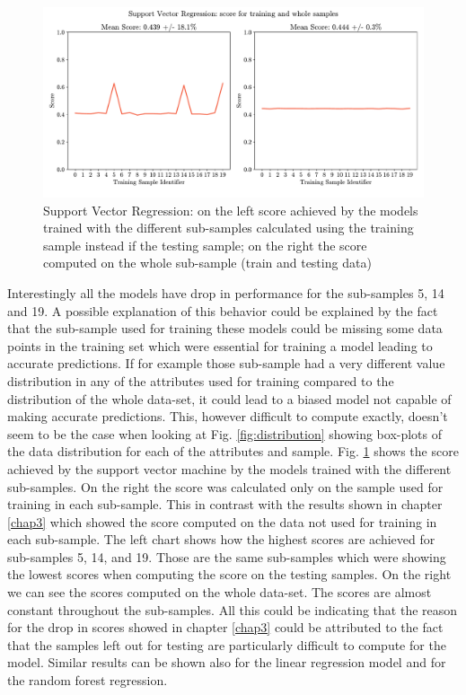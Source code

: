 \begin{figure}[!tp]
	\centering		  
	\includegraphics[width=1.\textwidth]{figures/SVR_score_tr.pdf}
	\caption{Support Vector Regression: on the left score achieved by the models trained with the different sub-samples calculated using the training sample instead if the testing sample; on the right the score computed on the whole sub-sample (train and testing data)}
	\label{fig:train-score}
\end{figure}

Interestingly all the models have drop in performance for the sub-samples  5, 14 and 19. A possible explanation of this behavior could be explained by the fact that the sub-sample used for training these models could be missing some data points in the training set which were essential for training a model leading to accurate predictions. If for example those sub-sample had a very different value distribution in any of the attributes used for training compared to the distribution of the whole data-set, it could lead to a biased model not capable of making accurate predictions. This, however difficult to compute exactly, doesn't seem to be the case when looking at Fig. \ref{fig:distribution} showing box-plots of the data distribution for each of the attributes and sample.
Fig. \ref{fig:train-score} shows the score achieved by the support vector machine by the models trained with the different sub-samples. On the right the score was calculated only on the sample used for training in each sub-sample. This in contrast with the results shown in chapter \ref{chap3} which showed the score computed on the data not used for training in each sub-sample. The left chart shows how the highest scores are achieved for sub-samples 5, 14, and 19. Those are the same sub-samples which were showing the lowest scores when computing the score on the testing samples. On the right we can see the scores computed on the whole data-set. The scores are almost constant throughout the sub-samples. All this could be indicating that the reason for the drop in scores showed in chapter \ref{chap3} could be attributed to the fact that the samples left out for testing are particularly difficult to compute for the model. Similar results can be shown also for the linear regression model and for the random forest regression.

